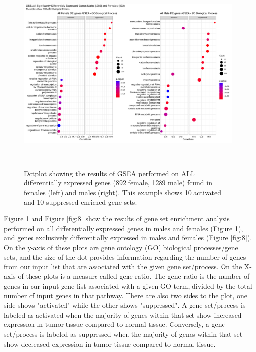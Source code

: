 \documentclass[10pt]{article}
\providecommand{\figref}[1]{Figure \ref{#1}}  %
\begin{document}
	\begin{figure}[!h]
		\centering
		\includegraphics[width=17cm, height=10cm]{all_cancersgsea_alldegenes_male_female_bp0.9.png}
		\caption{Dotplot showing the results of GSEA performed on ALL differentially expressed genes (892 female, 1289 male) found in females (left) and males (right). This example shows 10 activated and 10 suppressed enriched gene sets.}
		\label{fig:7}
	\end{figure}

	\figref{fig:7} and \figref{fig:8} show the results of gene set enrichment analysis performed on all differentially expressed genes in males and females (\figref{fig:7}), and genes exclusively differentially expressed in males and females (\figref{fig:8}). On the y-axis of these plots are gene ontology (GO) biological processes/gene sets, and the size of the dot provides information regarding the number of genes from our input list that are associated with the given gene set/process. On the X-axis of these plots is a measure called gene ratio. The gene ratio is the number of genes in our input gene list associated with a given GO term, divided by the total number of input genes in that pathway. There are also two sides to the plot, one side shows "activated" while the other shows "suppressed". A gene set/process is labeled as activated when the majority of genes within that set show increased expression in tumor tissue compared to normal tissue. Conversely, a gene set/process is labeled as suppressed when the majority of genes within that set show decreased expression in tumor tissue compared to normal tissue.
	
\end{document}
